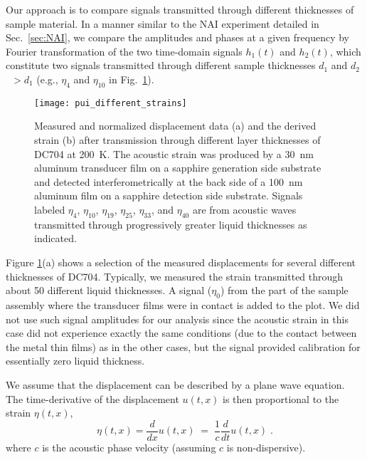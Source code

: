 \documentclass[reprint,showpacs,amsmath,amssymb,aip,jcp]{revtex4-1}
\begin{document}
Our approach is to compare signals transmitted through different
thicknesses of sample material. In a manner similar to the NAI
experiment detailed in Sec.~\ref{sec:NAI}, we compare the amplitudes
and phases at a given frequency by Fourier transformation of the two
time-domain signals $h_1(t)$ and $h_2(t)$, which constitute two
signals transmitted through different sample thicknesses $d_1$ and
$d_2$~$>d_1$ (e.g., $\eta_4$ and $\eta_{10}$ in
Fig.\ \ref{fig:PUI_different_strains}).

\begin{figure}
  \centering
  \texttt{[image: pui\_different\_strains]}
  \caption{\label{fig:PUI_different_strains}Measured and normalized
    displacement data (a) and the derived strain (b) after
    transmission through different layer thicknesses of DC704 at
    200~K. The acoustic strain was produced by a 30~nm aluminum
    transducer film on a sapphire generation side substrate and
    detected interferometrically at the back side of a 100~nm aluminum
    film on a sapphire detection side substrate. Signals labeled
    $\eta_4$, $\eta_{10}$, $\eta_{19}$, $\eta_{25}$, $\eta_{33}$, and
    $\eta_{40}$ are from acoustic waves transmitted through
    progressively greater liquid thicknesses as indicated.}
\end{figure}

Figure \ref{fig:PUI_different_strains}(a) shows a selection of the
measured displacements for several different thicknesses of DC704.
Typically, we measured the strain transmitted through about 50
different liquid thicknesses. A signal ($\eta_0$) from the part of the
sample assembly where the transducer films were in contact is added to
the plot. We did not use such signal amplitudes for our analysis since
the acoustic strain in this case did not experience exactly the same
conditions (due to the contact between the metal thin films) as in the
other cases, but the signal provided calibration for essentially zero
liquid thickness.

We assume that the displacement can be described by a plane wave
equation.  The time-derivative of the displacement $u(t,x)$ is then
proportional to the strain $\eta(t,x)$,
\begin{equation}
  \eta(t,x) = \frac{d}{dx} u(t,x) \;=\; \frac{1}{c} \frac{d}{dt}
  u(t,x) \;.
\end{equation}
where $c$ is the acoustic phase velocity (assuming $c$ is
non-dispersive).
\end{document}
